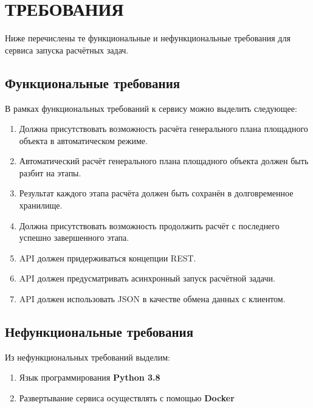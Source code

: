 \section*{\Large{ТРЕБОВАНИЯ}}

Ниже перечислены те функциональные и нефункциональные требования
для сервиса запуска расчётных задач.

\subsection*{\large{Функциональные требования}}

В рамках функциональных требований к сервису можно выделить следующее:
\begin{enumerate}
    \item {
       Должна присутствовать возможность расчёта генерального плана площадного объекта в автоматическом режиме.
    }
    \item {
        Автоматический расчёт генерального плана площадного объекта должен быть разбит на этапы.
    }
    \item {
        Результат каждого этапа расчёта должен быть сохранён в долговременное хранилище.
    }
    \item {
        Должна присутствовать возможность продолжить расчёт с последнего успешно завершенного этапа.
    }
    \item API должен придерживаться концепции REST.
    \item API должен предусматривать асинхронный запуск расчётной задачи.
    \item API должен использовать JSON в качестве обмена данных с клиентом.
\end{enumerate}

\subsection*{\large{Нефункциональные требования}}

Из нефункциональных требований выделим:
\begin{enumerate}
    \item Язык программирования \textbf{Python 3.8}
    \item Развертывание сервиса осуществлять с помощью \textbf{Docker}
\end{enumerate}
